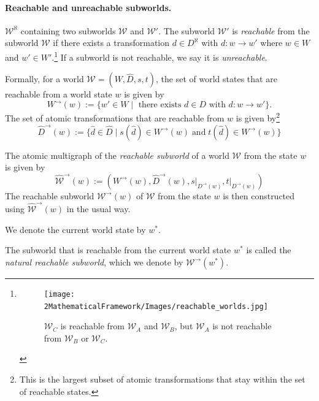 \paragraph{Reachable and unreachable subworlds.}
 $\mathscr{W}^{\aleph}$ containing two subworlds $\mathscr{W}$ and $\mathscr{W}'$.
The subworld $\mathscr{W}'$ is \emph{reachable} from the subworld $\mathscr{W}$ if there exists a transformation $d \in D^{\aleph}$ with $d: w \to w'$ where $w \in W$ and $w' \in W'$.\footnote{
\begin{figure}[H]
	\centering
	\texttt{[image: 2MathematicalFramework/Images/reachable\_worlds.jpg]}
	\caption{
		$\mathscr{W}_{C}$ is reachable from $\mathscr{W}_{A}$ and $\mathscr{W}_{B}$, but $\mathscr{W}_{A}$ is not reachable from $\mathscr{W}_{B}$ or $\mathscr{W}_{C}$.
	}
	\label{fig:reachable_worlds}
\end{figure}
}
If a subworld is not reachable, we say it is \emph{unreachable}.

Formally, for a world $\mathscr{W} = (W, \hat{D}, s, t)$, the set of world states that are reachable from a world state $w$ is given by
\begin{equation}
	W^{\to}(w) := \{ w' \in W \mid \text{ there exists } d \in D \text{ with } d: w \to w' \}.
\end{equation}
The set of atomic transformations that are reachable from $w$ is given by\footnote{
	This is the largest subset of atomic transformations that stay within the set of reachable states.
}
\begin{equation}
	\hat{D}^{\to}(w) := \{ \hat{d} \in \hat{D} \mid s(\hat{d}) \in W^{\to}(w) \; \text{and} \; t(\hat{d}) \in W^{\to}(w) \}
\end{equation}

The atomic multigraph of the \emph{reachable subworld} of a world $\mathscr{W}$ from the state $w$ is given by
\begin{equation}
	\hat{\mathscr{W}}^{\to}(w) := (W^{\to}(w), \hat{D}^{\to}(w), s \big|_{D^{\to}(w)}, t \big|_{D^{\to}(w)})
\end{equation}
The reachable subworld $\mathscr{W}^{\to}(w)$ of $\mathscr{W}$ from the state $w$ is then constructed using $\hat{\mathscr{W}}^{\to}(w)$ in the usual way.

\begin{notation}
	We denote the current world state by $w^{*}$.
\end{notation}

The subworld that is reachable from the current world state $w^{*}$ is called the \emph{natural reachable subworld}, which we denote by $\mathscr{W}^{\to}(w^{*})$.
